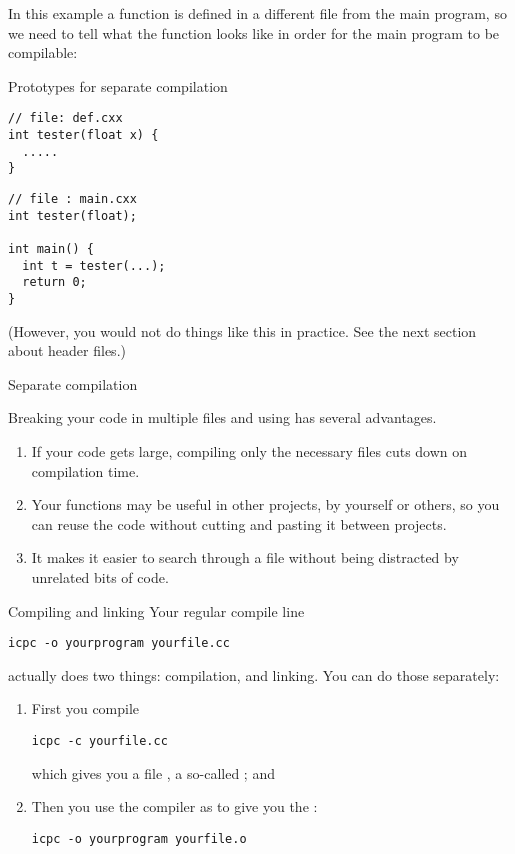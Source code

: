 In this example a function 
is defined in a different file from the main program, so we need to
tell  what the function looks like in order for the main
program to be compilable:

\begin{block}{Prototypes for separate compilation}
  \label{sl:separate-proto}
  \begin{multicols}{2}  
\begin{lstlisting}
// file: def.cxx
int tester(float x) {
  .....
}
\end{lstlisting}
\vfill\columnbreak
\begin{lstlisting}
// file : main.cxx
int tester(float);

int main() {
  int t = tester(...);
  return 0;
}
\end{lstlisting}
  \end{multicols}
\end{block}

(However, you would not do things like this in practice. See the next
section about header files.)

 {Separate compilation}

Breaking your code in multiple files and using
 has several advantages.
\begin{enumerate}
\item If your code gets large, compiling only the necessary files cuts
  down on compilation time.
\item Your functions may be useful in other projects, by yourself or
  others, so you can reuse the code without cutting and pasting it
  between projects.
\item It makes it easier to search through a file without being
  distracted by unrelated bits of code.
\end{enumerate}

\begin{block}{Compiling and linking}
  \label{sl:compile-link}
  Your regular compile line
\begin{verbatim}
icpc -o yourprogram yourfile.cc
\end{verbatim}
  actually does two things: compilation, and linking. You can do those
  separately:
  \begin{enumerate}
  \item First you compile
\begin{verbatim}
icpc -c yourfile.cc
\end{verbatim}
  which gives you a file , a so-called
  ; and
  \item Then you use the compiler as  to give you
    the :
\begin{verbatim}
icpc -o yourprogram yourfile.o
\end{verbatim}
  \end{enumerate}
\end{block}

